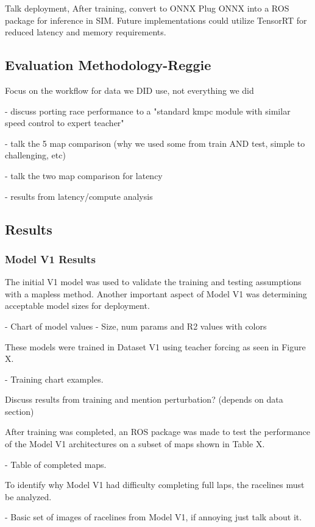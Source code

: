 \documentclass[conference]{IEEEtran}
\begin{document}
Talk deployment,
After training, 
convert to ONNX
Plug ONNX into a ROS package for inference in SIM.
Future implementations could utilize TensorRT for reduced latency and memory requirements. 

\subsection{Evaluation Methodology-Reggie}
Focus on the workflow for data we DID use, not everything we did

- discuss porting race performance to a "standard kmpc module with similar speed control to expert teacher"

- talk the 5 map comparison (why we used some from train AND test, simple to challenging, etc)

- talk the two map comparison for latency

- results from latency/compute analysis


\subsection{Results}

\subsubsection{Model V1 Results}

The initial V1 model was used to validate the training and testing assumptions with a mapless method. Another important aspect of Model V1 was determining acceptable model sizes for deployment.


- Chart of model values
- Size, num params and R2 values with colors 


These models were trained in Dataset V1 using teacher forcing as seen in Figure X.

- Training chart examples.

Discuss results from training and mention perturbation? (depends on data section)

After training was completed, an ROS package was made to test the performance of the Model V1 architectures on a subset of maps shown in Table X.

- Table of completed maps. 

To identify why Model V1 had difficulty completing full laps, the racelines must be analyzed. 


- Basic set of images of racelines from Model V1, if annoying just talk about it.
\end{document}
